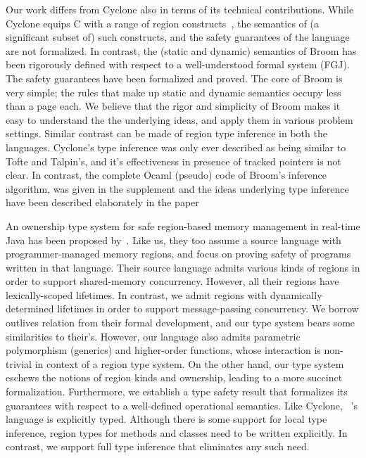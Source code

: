 Our work differs from Cyclone also in terms of its technical
contributions. While Cyclone equips C with a range of region
constructs~\cite{cycloneSCP}, the semantics of (a significant subset
of) such constructs, and the safety guarantees of the language are not
formalized. In contrast, the (static and dynamic) semantics of Broom
has been rigorously defined with respect to a well-understood formal
system (FGJ). The safety guarantees have been formalized and proved.
The core of Broom is very simple; the rules that make up static and
dynamic semantics occupy less than a page each. We believe that the
rigor and simplicity of Broom makes it easy to understand the the
underlying ideas, and apply them in various problem settings. Similar
contrast can be made of region type inference in both the languages.
Cyclone’s type inference was only ever described as being similar to
Tofte and Talpin’s, and it’s effectiveness in presence of tracked
pointers is not clear. In contrast, the complete Ocaml (pseudo) code
of Broom's inference algorithm, was given in the supplement and the
ideas underlying type inference have been described elaborately in the
paper

An ownership type system for safe region-based memory management in
real-time Java has been proposed by~\cite{MIT03}. Like us, they too
assume a source language with programmer-managed memory regions, and
focus on proving safety of programs written in that language. Their
source language admits various kinds of regions in order to support
shared-memory concurrency. However, all their regions have
lexically-scoped lifetimes. In contrast, we admit regions with
dynamically determined lifetimes in order to support message-passing
concurrency. We borrow outlives relation from their formal
development, and our type system bears some similarities to their's.
However, our language also admits parametric polymorphism (generics)
and higher-order functions, whose interaction is non-trivial in
context of a region type system. On the other hand, our type system
eschews the notions of region kinds and ownership, leading to a more
succinct formalization. Furthermore, we establish a type safety result
that formalizes its guarantees with respect to a well-defined
operational semantics. Like Cyclone, ~\cite{MIT03}'s language is
explicitly typed. Although there is some support for local type
inference, region types for methods and classes need to be written
explicitly. In contrast, we support full type inference that
eliminates any such need.

